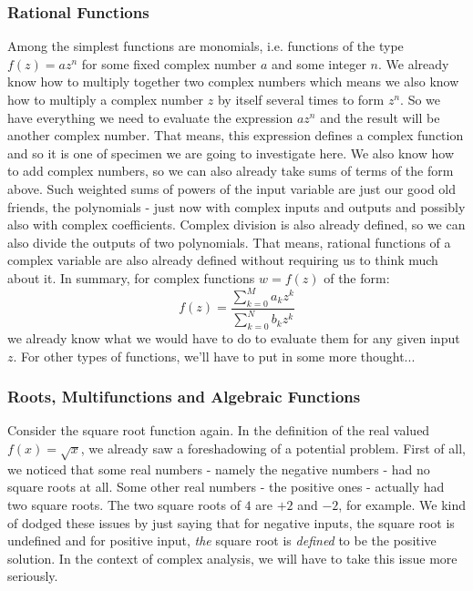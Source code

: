 \subsubsection{Rational Functions}
Among the simplest functions are monomials, i.e. functions of the type $f(z) = a z^n$ for some fixed complex number $a$ and some integer $n$. We already know how to multiply together two complex numbers which means we also know how to multiply a complex number $z$ by itself several times to form $z^n$. So we have everything we need to evaluate the expression $a z^n$ and the result will be another complex number. That means, this expression defines a complex function and so it is one of specimen we are going to investigate here. We also know how to add complex numbers, so we can also already take sums of terms of the form above. Such weighted sums of powers of the input variable are just our good old friends, the polynomials - just now with complex inputs and outputs and possibly also with complex coefficients. Complex division is also already defined, so we can also divide the outputs of two polynomials. That means, rational functions of a complex variable are also already defined without requiring us to think much about it. In summary, for complex functions $w = f(z)$ of the form:
\begin{equation}
f(z) = \frac{\sum_{k=0}^{M} a_k z^k}{\sum_{k=0}^{N} b_k z^k}
\end{equation}
we already know what we would have to do to evaluate them for any given input $z$. For other types of functions, we'll have to put in some more thought...




\subsubsection{Roots, Multifunctions and Algebraic Functions}
Consider the square root function again. In the definition of the real valued $f(x) = \sqrt{x}$, we already saw a foreshadowing of a potential problem. First of all, we noticed that some real numbers - namely the negative numbers - had no square roots at all. Some other real numbers - the positive ones - actually had two square roots. The two square roots of $4$ are $+2$ and $-2$, for example. We kind of dodged these issues by just saying that for negative inputs, the square root is undefined and for positive input, \emph{the} square root is \emph{defined} to be the positive solution. In the context of complex analysis, we will have to take this issue more seriously. 

